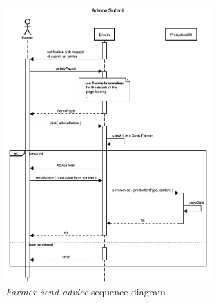 \begin{enumerate}
\begin{figure}[H]
\begin{center}
        \includegraphics[width=0.7\textwidth]{sequence/AdviceSubmit.png}
        \caption{\emph{Farmer send advice} sequence diagram}
        \label{fig:state7}
        \end{center}
    \end{figure}


\end{enumerate}
